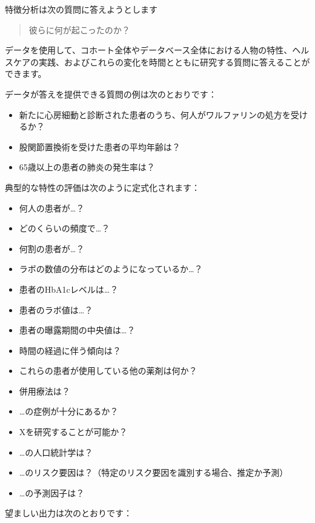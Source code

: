 \documentclass[
  11pt]{book}
\providecommand{\tightlist}{%
  \setlength{\itemsep}{0pt}\setlength{\parskip}{0pt}}
\theoremstyle{definition}
\theoremstyle{definition}
\theoremstyle{definition}
\theoremstyle{definition}
\theoremstyle{remark}
\begin{document}

特徴分析は次の質問に答えようとします

\begin{quote}
彼らに何が起こったのか？
\end{quote}

データを使用して、コホート全体やデータベース全体における人物の特性、ヘルスケアの実践、およびこれらの変化を時間とともに研究する質問に答えることができます。

データが答えを提供できる質問の例は次のとおりです：

\begin{itemize}
\tightlist
\item
  新たに心房細動と診断された患者のうち、何人がワルファリンの処方を受けるか？
\item
  股関節置換術を受けた患者の平均年齢は？
\item
  65歳以上の患者の肺炎の発生率は？
\end{itemize}

典型的な特性の評価は次のように定式化されます：

\begin{itemize}
\tightlist
\item
  何人の患者が\ldots？
\item
  どのくらいの頻度で\ldots？
\item
  何割の患者が\ldots？
\item
  ラボの数値の分布はどのようになっているか\ldots？
\item
  患者のHbA1cレベルは\ldots？
\item
  患者のラボ値は\ldots？
\item
  患者の曝露期間の中央値は\ldots？
\item
  時間の経過に伴う傾向は？
\item
  これらの患者が使用している他の薬剤は何か？
\item
  併用療法は？
\item
  \ldots の症例が十分にあるか？
\item
  Xを研究することが可能か？
\item
  \ldots の人口統計学は？
\item
  \ldots のリスク要因は？（特定のリスク要因を識別する場合、推定か予測）
\item
  \ldots の予測因子は？
\end{itemize}

望ましい出力は次のとおりです：
\end{document}
